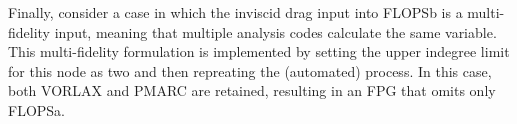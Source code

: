 
	Finally, consider a case in which 
the inviscid drag input into FLOPSb is a multi-fidelity input, meaning that 
 multiple analysis codes calculate the same variable. 
	This multi-fidelity formulation is implemented by setting the upper indegree limit for this node as two and then repreating the (automated) process. 
	In this case, both VORLAX and PMARC are retained, resulting in an FPG that omits only FLOPSa.

